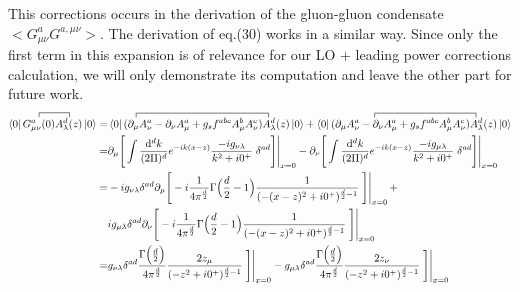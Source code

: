 \documentclass[openright,twoside,12pt,a4paper,final]{article}
\begin{document}
	This corrections occurs in the derivation of the gluon-gluon condensate $<G^a_{\mu \nu} G^{a,\mu \nu}>$.
	The derivation of eq.(30) works in a similar way. Since only the first term in this expansion is of relevance for our LO + leading power corrections calculation, we will only demonstrate its computation and leave the other part for future work.
	\begin{align}
		\bra{0} \contraction{}{G^a_{\mu \nu}(0)}{ }{A^d_{\lambda}(z)} G^a_{\mu \nu}(0) A^d_{\lambda}(z) \ket{0} =& \bra{0} \contraction{}{\partial_{\mu} A^a_{\nu}}{-\partial_{\nu} A^a_{\mu} + g_s f^{abc} A^b_{\mu} A^c_{\nu} }{A^d_{\lambda}(z)} (\partial_{\mu} A^a_{\nu} -\partial_{\nu} A^a_{\mu} + g_s f^{abc} A^b_{\mu} A^c_{\nu}) A^d_{\lambda}(z) \ket{0} + \bra{0} \contraction{\partial_{\mu} A^a_{\nu}}{ -\partial_{\nu} A^a_{\mu}}{ + g_s f^{abc} A^b_{\mu} A^c_{\nu} }{A^d_{\lambda}(z)} (\partial_{\mu} A^a_{\nu} -\partial_{\nu} A^a_{\mu} + g_s f^{abc} A^b_{\mu} A^c_{\nu}) A^d_{\lambda}(z) \ket{0} \nonumber \\ =& \partial_{\mu} \Bigg[ \int \frac{\mathrm{d}^d k}{(2 \Pi)^d} e^{-ik(x - z)} \frac{-i g_{\nu \lambda}}{k^2 + i0^+} \left. \delta^{ad}\Bigg] \right|_{x = 0} - \partial_{\nu} \Bigg[\int \frac{\mathrm{d}^d k}{(2 \Pi)^d} e^{-ik(x - z)} \frac{-i g_{\mu \lambda}}{k^2 + i0^+} \left. \delta^{ad}\Bigg] \right|_{x = 0} \nonumber \\ =& -i g_{\nu \lambda} \delta^{ad} \partial_{\mu} \Bigg[-i \frac{1}{4 \pi^{\frac{d}{2}}} \Gamma\Big(\frac{d}{2} - 1\Big) \frac{1}{(-(x - z)^2 + i0^+)^{\frac{d}{2} - 1}}\left.\Bigg] \right|_{x=0} + \nonumber \\& i g_{\mu \lambda} \delta^{ad} \partial_{\nu} \Bigg[-i \frac{1}{4 \pi^{\frac{d}{2}}} \Gamma\Big(\frac{d}{2} - 1\Big) \frac{1}{(-(x - z)^2 + i0^+)^{\frac{d}{2} - 1}}\left.\Bigg] \right|_{x=0} \nonumber \\ =&  g_{\nu \lambda} \delta^{ad} \frac{\Gamma\Big(\frac{d}{2}\Big)}{4 \pi^{\frac{d}{2}}}  \frac{2 z_{\mu}}{(-z^2 + i0^+)^{\frac{d}{2} - 1}}\left.\Bigg] \right|_{x=0}  \nonumber - g_{\mu \lambda} \delta^{ad} \frac{\Gamma\Big(\frac{d}{2}\Big)}{4 \pi^{\frac{d}{2}}} \frac{2 z_{\nu }}{(-z^2 + i0^+)^{\frac{d}{2} - 1}}\left.\Bigg] \right|_{x=0}
	\end{align}
	
	
	
	
\end{document}
